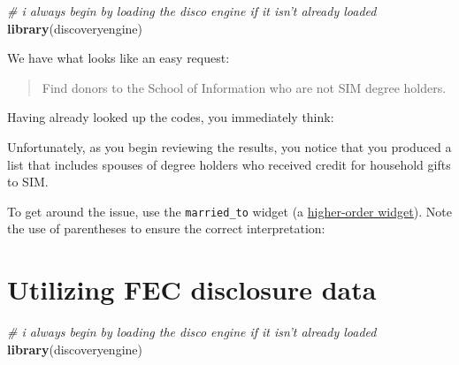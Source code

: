 \documentclass[]{book}
\newenvironment{Shaded}{\begin{snugshade}}{\end{snugshade}}
\newcommand{\CommentTok}[1]{\textcolor[rgb]{0.56,0.35,0.01}{\textit{#1}}}
\newcommand{\KeywordTok}[1]{\textcolor[rgb]{0.13,0.29,0.53}{\textbf{#1}}}
\newcommand{\NormalTok}[1]{#1}
\newcommand{\OperatorTok}[1]{\textcolor[rgb]{0.81,0.36,0.00}{\textbf{#1}}}
\newcommand{\StringTok}[1]{\textcolor[rgb]{0.31,0.60,0.02}{#1}}
\begin{document}
\begin{Shaded}
\begin{Highlighting}[]
\CommentTok{# i always begin by loading the disco engine if it isn't already loaded}
\KeywordTok{library}\NormalTok{(discoveryengine)}
\end{Highlighting}
\end{Shaded}

We have what looks like an easy request:

\begin{quote}
Find donors to the School of Information who are not SIM degree holders.
\end{quote}

Having already looked up the codes, you immediately think:

\begin{Shaded}
\end{Shaded}

Unfortunately, as you begin reviewing the results, you notice that you produced a list that includes spouses of degree holders who received credit for household gifts to SIM.

To get around the issue, use the \texttt{married\_to} widget (a \protect\hyperlink{higher-order-widgets}{higher-order widget}). Note the use of parentheses to ensure the correct interpretation:

\begin{Shaded}
\end{Shaded}

\hypertarget{ex-fec}{%
\chapter{Utilizing FEC disclosure data}\label{ex-fec}}

\begin{Shaded}
\begin{Highlighting}[]
\CommentTok{# i always begin by loading the disco engine if it isn't already loaded}
\KeywordTok{library}\NormalTok{(discoveryengine)}
\end{Highlighting}
\end{Shaded}
\end{document}
